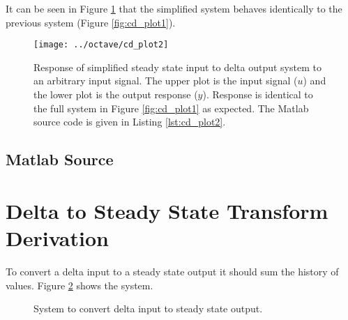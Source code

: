 \documentclass{article}
\begin{document}
It can be seen in Figure \ref{fig:cd_plot2} that the simplified system
behaves identically to the previous system (Figure \ref{fig:cd_plot1}).

\begin{figure}[htbp!]
\texttt{[image: ../octave/cd\_plot2]}
\caption{Response of simplified steady state input to delta output system
to an arbitrary input signal.
The upper plot is the input signal ($u$) and the lower plot is
the output response ($y$).
Response is identical to the full system in Figure \ref{fig:cd_plot1}
as expected.
The Matlab source code is given in Listing \ref{lst:cd_plot2}.
}
\label{fig:cd_plot2}
\end{figure}

\clearpage
\subsection{Matlab Source}
\label{app:cdsrc}

\nocite{octave}



\clearpage



\clearpage
\section{Delta to Steady State Transform Derivation}
\label{app:dsderiv}

To convert a delta input to a steady state output it should
sum the history of values.
Figure \ref{fig:dc1} shows the system.

\begin{figure}[hpb!]
\begin{center}


\end{center}

\caption{System to convert delta input to steady state output.}
\label{fig:dc1}
\end{figure}
\end{document}
